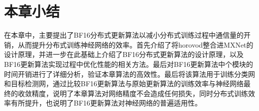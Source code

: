 \section{本章小结}
在本章中，主要提出了BF16分布式更新算法以减小分布式训练过程中通信量的开销，从而提升分布式训练神经网络的效率。首先介绍了将horovod整合进MXNet的设计原理，并进一步在此基础上介绍了BF16分布式更新算法的设计原理，以及BF16更新算法实现过程中优化性能的相关方法。最后对BF16更新算法中个模块的时间开销进行了详细分析，验证本章算法的高效性。最后将该算法用于训练分类网和目标检测网，通过比较BF16更新算法与原始更新算法的训练效率与神经网络最终的收敛精度，说明了本章算法对网络精度不会造成任何损失，同时分布式训练效率有所提升，也说明了BF16更新算法对神经网络的普遍适用性。
